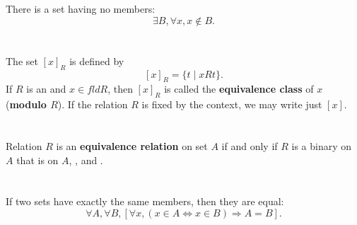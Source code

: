 \documentclass{report}
\begin{document}
There is a set having no members:
  $$\exists B, \forall x, x \not\in B.$$

\begin{axiom}


\end{axiom}

\section{}%

The set $[x]_R$ is defined by $$[x]_R = \{t \mid xRt\}.$$
If $R$ is an  and $x \in fld R$, then $[x]_R$
  is called the \textbf{equivalence class} of $x$ (\textbf{modulo $R$}).
If the relation $R$ is fixed by the context, we may write just $[x]$.

\begin{definition}


\end{definition}

\section{}%

Relation $R$ is an \textbf{equivalence relation} on set $A$ if and only if
  $R$ is a binary  on $A$ that is 
  on $A$, , and .

\begin{definition}


\end{definition}

\section{}%

If two sets have exactly the same members, then they are equal:
  $$\forall A, \forall B,
      \left[\forall x, (x \in A \iff x \in B) \Rightarrow A = B\right].$$
\end{document}
